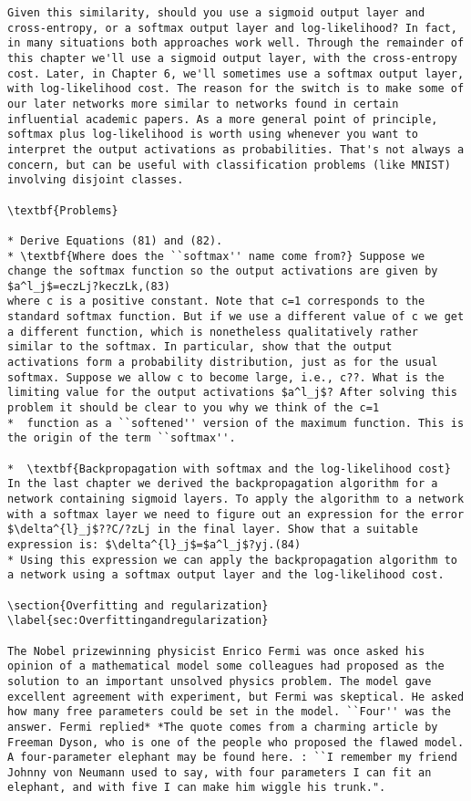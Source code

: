 \begin{lstlisting}
Given this similarity, should you use a sigmoid output layer and cross-entropy, or a softmax output layer and log-likelihood? In fact, in many situations both approaches work well. Through the remainder of this chapter we'll use a sigmoid output layer, with the cross-entropy cost. Later, in Chapter 6, we'll sometimes use a softmax output layer, with log-likelihood cost. The reason for the switch is to make some of our later networks more similar to networks found in certain influential academic papers. As a more general point of principle, softmax plus log-likelihood is worth using whenever you want to interpret the output activations as probabilities. That's not always a concern, but can be useful with classification problems (like MNIST) involving disjoint classes.

\textbf{Problems}

* Derive Equations (81) and (82).
* \textbf{Where does the ``softmax'' name come from?} Suppose we change the softmax function so the output activations are given by 
$a^l_j$=eczLj?keczLk,(83)
where c is a positive constant. Note that c=1 corresponds to the standard softmax function. But if we use a different value of c we get a different function, which is nonetheless qualitatively rather similar to the softmax. In particular, show that the output activations form a probability distribution, just as for the usual softmax. Suppose we allow c to become large, i.e., c??. What is the limiting value for the output activations $a^l_j$? After solving this problem it should be clear to you why we think of the c=1
*  function as a ``softened'' version of the maximum function. This is the origin of the term ``softmax''.

*  \textbf{Backpropagation with softmax and the log-likelihood cost} In the last chapter we derived the backpropagation algorithm for a network containing sigmoid layers. To apply the algorithm to a network with a softmax layer we need to figure out an expression for the error $\delta^{l}_j$??C/?zLj in the final layer. Show that a suitable expression is: $\delta^{l}_j$=$a^l_j$?yj.(84)
* Using this expression we can apply the backpropagation algorithm to a network using a softmax output layer and the log-likelihood cost.

\section{Overfitting and regularization}
\label{sec:Overfittingandregularization}

The Nobel prizewinning physicist Enrico Fermi was once asked his opinion of a mathematical model some colleagues had proposed as the solution to an important unsolved physics problem. The model gave excellent agreement with experiment, but Fermi was skeptical. He asked how many free parameters could be set in the model. ``Four'' was the answer. Fermi replied* *The quote comes from a charming article by Freeman Dyson, who is one of the people who proposed the flawed model. A four-parameter elephant may be found here. : ``I remember my friend Johnny von Neumann used to say, with four parameters I can fit an elephant, and with five I can make him wiggle his trunk.".


\end{lstlisting}
